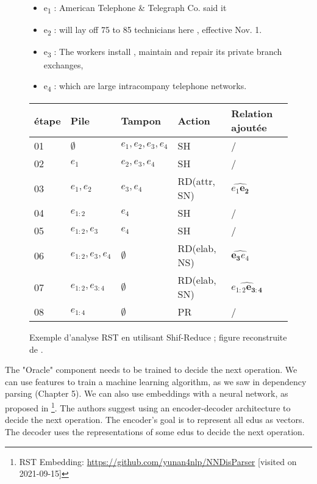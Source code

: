 \documentclass{KBook}
\begin{document}
\begin{figure}[!ht]
	\centering
	\begin{minipage}{0.25\textwidth}
	\end{minipage}
	\begin{minipage}{0.70\textwidth}
		\small
		\begin{itemize}
			\item e\textsubscript{1} : American Telephone \& Telegraph Co. said it
			\item e\textsubscript{2} : will lay off 75 to 85 technicians here , effective Nov. 1.
			\item e\textsubscript{3} : The workers install , maintain and repair its private branch exchanges,
			\item e\textsubscript{4} : which are large intracompany telephone networks.
		\end{itemize}
	\end{minipage}
	
	\begin{tabular}{lllll}
		\hline\hline 
		étape & Pile & Tampon & Action & Relation ajoutée \\
		\hline
		01 & $\emptyset$ & $e_1, e_2, e_3, e_4$ & SH & / \\
		02 & $e_1$ & $e_2, e_3, e_4$ & SH & / \\
		03 & $e_1, e_2$ & $e_3, e_4$ & RD(attr, SN) & $\widehat{e_1 \mathbf{e_2}}$ \\
		04 & $e_{1:2}$ & $e_4$ & SH & / \\
		05 & $e_{1:2}, e_3$ & $e_4$ & SH & / \\
		06 & $e_{1:2}, e_3, e_4$ & $\emptyset$ & RD(elab, NS) & $\widehat{\mathbf{e_3} e_4}$ \\
		07 & $e_{1:2}, e_{3:4}$ & $\emptyset$ & RD(elab, SN) & $\widehat{e_{1:2}\mathbf{e_{3:4}}}$ \\
		08 & $e_{1:4}$ & $\emptyset$ & PR & / \\
		\hline\hline
	\end{tabular}
	
	\caption[Exemple d'analyse RST en utilisant Shif-Reduce]{Exemple d'analyse RST en utilisant Shif-Reduce ; figure reconstruite de \cite{2018-yu-al}.}
	\label{fig:rst-shred-yu-al}
\end{figure}


The "Oracle" component needs to be trained to decide the next operation. We can use features to train a machine learning algorithm, as we saw in dependency parsing (Chapter 5). We can also use embeddings with a neural network, as proposed in \cite{2018-yu-al}\footnote{RST Embedding: \url{https://github.com/yunan4nlp/NNDisParser} [visited on 2021-09-15]}. The authors suggest using an encoder-decoder architecture to decide the next operation. The encoder's goal is to represent all \acp{edu} as vectors. The decoder uses the representations of some \acp{edu} to decide the next operation.
\end{document}
